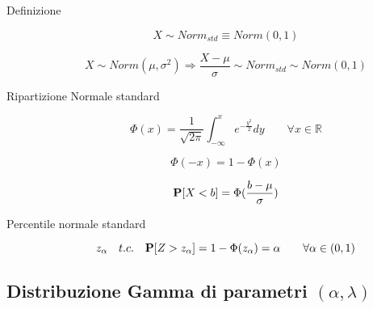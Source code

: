 \begin{description}
	\item [Definizione]
		\begin{equation}
		X \sim Norm_{std} \equiv Norm(0,1)
		\end{equation}
		
		\begin{equation}
		X \sim Norm(\mu,\sigma^{2}) \Rightarrow \frac{X-\mu}{\sigma} \sim Norm_{std} \sim Norm(0,1) 
		\end{equation}
		
	\item [Ripartizione Normale standard]
		\begin{equation}
		\Phi(x) = \frac{1}{\sqrt{2\pi}} \int_{-\infty}^{x} e^{-\frac{y^{2}}{2}} dy \qquad\forall x \in \mathbb{R}
		\end{equation}
		
		\begin{equation}
		\Phi(-x) = 1 - \Phi(x)
		\end{equation}
		
		\begin{equation}
		\mathbf{P}[X<b] = \Phi(\frac{b-\mu}{\sigma})
		\end{equation}
		
	\item [Percentile normale standard]
		\begin{equation}
		z_{\alpha}\quad t.c. \quad \mathbf{P}[Z>z_{\alpha}] = 1-\Phi(z_{\alpha}) = \alpha \qquad\forall \alpha \in (0,1)
		\end{equation}	
	
\end{description}


\subsection{Distribuzione Gamma di parametri $(\alpha,\lambda)$}

